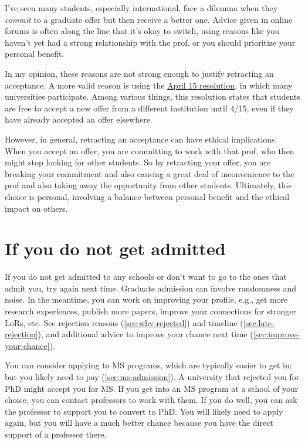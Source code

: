 \documentclass[oneside,11pt,dvipsnames]{book}
\begin{document}
I've seen many students, especially international, face a dilemma when they \emph{commit} to a graduate offer but then receive a better one. Advice given in online forums is often along the line that it's okay to switch, using reasons like you haven't yet had a strong relationship with the prof. or you should prioritize your personal benefit.

In my opinion, these reasons are not strong enough to justify retracting an acceptance. A more valid reason is using the \href{https://cgsnet.org/wp-content/uploads/2024/01/CGS_April15_Resolution_Jan312024.pdf}{April 15 resolution}, in which many universities participate. Among various things, this resolution states that students are free to accept a new offer from a different institution until 4/15, even if they have already accepted an offer elsewhere. 

However, in general, retracting an acceptance can have ethical implications. When you accept an offer, you are committing to work with that prof, who then might stop looking for other students. So by retracting your offer, you are breaking your commitment and also causing a great deal of inconvenience to the prof and also taking away the opportunity from other students. 
Ultimately, this choice is personal, involving a balance between personal benefit and the ethical impact on others. 


\section{If you do not get admitted}\label{sec:not-accepted} 

If you do not get admitted to any schools or don't want to go to the ones that admit you, try again next time.  Graduate admission can involve randomness and noise. In the meantime, you can work on improving your profile, e.g., get more research experiences, publish more papers, improve your connections for stronger LoRs, etc. See rejection reasons (\autoref{sec:why-rejected}) and timeline (\autoref{sec:late-rejection}), and additional advice to improve your chance next time (\autoref{sec:improve-your-chance}).

You can consider applying to MS programs, which are typically easier to get in; but you likely need to pay (\autoref{sec:ms-admission}).  A university that rejected you for PhD might accept you for MS.
If you get into an MS program at a school of your choice, you can contact professors to work with them. If you do well, you can ask the professor to support you to convert to PhD. You will likely need to apply again, but you will have a much better chance because you have the direct support of a professor there.
\end{document}
